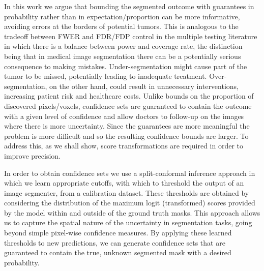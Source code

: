 In this work we argue that bounding the segmented outcome with guarantees in probability rather than in expectation/proportion can be more informative, avoiding errors at the borders of potential tumors. This is analogous to the tradeoff between FWER and FDR/FDP control in the multiple testing literature in which there is a balance between power and coverage rate, the distinction being that in medical image segmentation there can be a potentially serious consequence to making mistakes. Under-segmentation might cause part of the tumor to be missed, potentially leading to inadequate treatment. Over-segmentation, on the other hand, could result in unnecessary interventions, increasing patient risk and healthcare costs. Unlike bounds on the proportion of discovered pixels/voxels, confidence sets are guaranteed to contain the outcome with a given level of confidence and allow doctors to follow-up on the images where there is more uncertainty. Since the guarantees are more meaningful the problem is more difficult and so the resulting confidence bounds are larger. To address this, as we shall show, score transformations are required in order to improve precision. 

In order to obtain confidence sets we use a split-conformal inference approach in which we learn appropriate cutoffs, with which to threshold the output of an image segmenter, from a calibration dataset. These thresholds are obtained by considering the distribution of the maximum logit (transformed) scores provided by the model within and outside of the ground truth masks. This approach allows us to capture the spatial nature of the uncertainty in segmentation tasks, going beyond simple pixel-wise confidence measures. By applying these learned thresholds to new predictions, we can generate confidence sets that are guaranteed to contain the true, unknown segmented mask with a desired probability. 

 